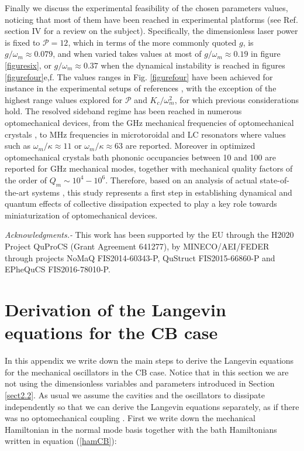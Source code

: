 \documentclass[a4paper]{jpconf}
\begin{document}
Finally we discuss the experimental feasibility of the chosen parameters values, noticing that most of them have been reached in experimental platforms 
(see Ref. \cite{1} section IV for a review on the subject). Specifically, the dimensionless laser power is fixed to $\mathcal{P}=12$, which in terms of the 
more commonly quoted $g$, is $g/\omega_m\approx0.079$, and when varied takes values at most of $g/\omega_m\approx0.19$ in figure \ref{figuresix}, or 
$g/\omega_m\approx0.37$ when the dynamical instability is reached in figures \ref{figurefour}e,f. 
The values ranges in Fig. \ref{figurefour} have been achieved for instance in the experimental setups of references \cite{58,59,60},
 with the exception of the highest range values explored for $\mathcal{P}$ and $K_c/\omega_m^2$, for which previous considerations hold. 
 The resolved sideband regime has been reached in numerous optomechanical 
devices, from the GHz mechanical frequencies of optomechanical crystals \cite{42}, to MHz frequencies in microtoroidal and LC resonators where
values such as $\omega_m/\kappa\approx11$ \cite{59} or  $\omega_m/\kappa\approx63$ \cite{60} are reported. 
Moreover in optimized optomechanical crystals \cite{17,61}
bath phononic occupancies between 10 and 100 are reported for GHz mechanical modes, together with mechanical quality factors of the order of 
$Q_m\sim10^4-10^6$. Therefore, based on an analysis of actual 
state-of-the-art systems \cite{1}, this study represents a first step in establishing dynamical and quantum effects of collective dissipation 
expected to play a key role towards miniaturization of optomechanical devices.

\textit{Acknowledgments.-} This  work  has  been  supported  by  the  EU through the H2020 Project QuProCS (Grant Agreement 641277),  by  MINECO/AEI/FEDER  through  projects 
NoMaQ  FIS2014-60343-P,  QuStruct  FIS2015-66860-P and EPheQuCS FIS2016-78010-P. 

\appendix


\section{Derivation of the Langevin equations for the CB case}
\label{appA}

In this appendix we write down the main steps to derive the Langevin equations for the mechanical oscillators in the CB case.  Notice that in this section we are not using
the dimensionless variables and parameters introduced in Section \ref{sect2.2}. As usual we assume the cavities and
the oscillators to dissipate independently so that we can derive the Langevin equations separately, as if there was no optomechanical coupling \cite{1,Giov}. First we 
write down the mechanical Hamiltonian in the normal mode basis together with the bath Hamiltonians written in equation (\ref{hamCB}):
\end{document}
